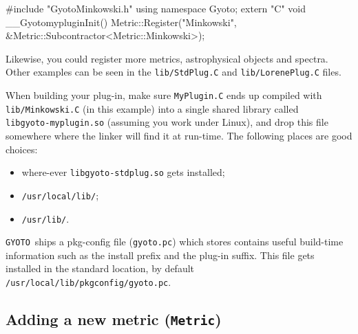 \documentclass[a4paper,12pt]{article}
\newcommand{\GYOTO}{\texttt{GYOTO}}
\newcommand{\Metric}{\texttt{Metric}}
\begin{document}
\begin{code}
#include "GyotoMinkowski.h"
using namespace Gyoto;
extern "C" void __GyotomypluginInit() {
  Metric::Register("Minkowski", \&Metric::Subcontractor<Metric::Minkowski>);
}
\end{code}

Likewise, you could register more metrics, astrophysical objects and
spectra. Other examples can be seen in the \texttt{lib/StdPlug.C} and
\texttt{lib/LorenePlug.C} files.

When building your plug-in, make sure \texttt{MyPlugin.C} ends up
compiled with\\ \texttt{lib/Minkowski.C} (in this example) into a single
shared library called\\ \texttt{libgyoto-myplugin.so} (assuming you work
under Linux), and drop this file somewhere where the linker will find
it at run-time. The following places are good choices:
\begin{itemize}
\item where-ever \texttt{libgyoto-stdplug.so} gets installed;
\item \texttt{/usr/local/lib/};
\item \texttt{/usr/lib/}.
\end{itemize}

\GYOTO\ ships a pkg-config file (\texttt{gyoto.pc}) which stores
contains useful build-time information such as the install prefix and
the plug-in suffix. This file gets installed in the standard location,
by default \texttt{/usr/local/lib/pkgconfig/gyoto.pc}.

\subsection{Adding a new metric (\Metric)}
\end{document}
